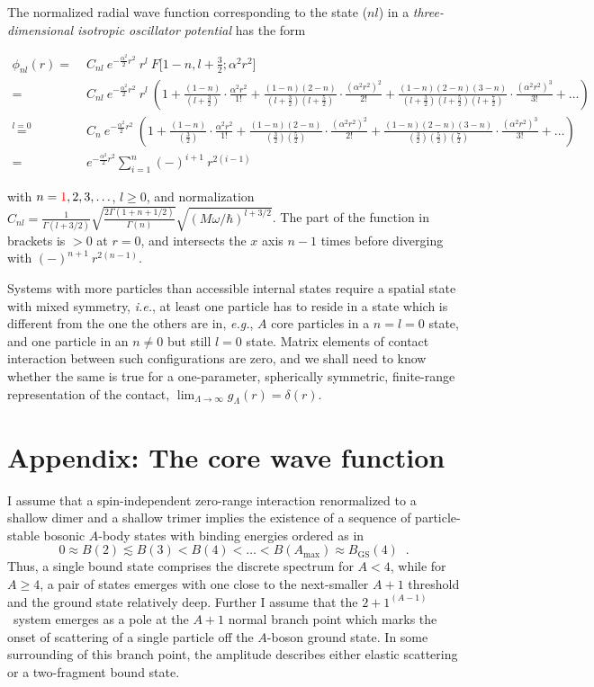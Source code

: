 \documentclass
[aps,nofootinbib,prl,showpacs,twocolumn,groupedaddress,superscriptaddress]
{revtex4}
\newcommand{\red}[1]{\textcolor{red}{#1}}
\newcommand{\la}{\label}
\newcommand{\be}{\begin{equation}}
\newcommand{\ee}{\end{equation}}
\newcommand{\eg}{\textit{e.g.}\;}
\newcommand{\ie}{\textit{i.e.}\;}
\newcommand{\abb}{\ensuremath{2\!+\!1^{(A-1)}}}
\begin{document}
The normalized radial wave function corresponding to the state ($nl$) in a 
{\it three-dimensional isotropic oscillator potential} has the form
\begin{widetext}
\begin{align*}
\phi_{nl}(r)=&\;C_{nl}~e^{-\frac{\alpha^2}{2}r^2}~r^l~F\big[1-n,l+\frac{3}{2};\alpha^2r^2\big]\\
=&\;C_{nl}~e^{-\frac{\alpha^2}{2}r^2}~r^l~
\left(1+\frac{(1-n)}{(l+\frac{3}{2})}\cdot\frac{\alpha^2r^2}{1!}
+\frac{(1-n)(2-n)}{(l+\frac{3}{2})(l+\frac{5}{2})}\cdot\frac{(\alpha^2r^2)^2}{2!}
+\frac{(1-n)(2-n)(3-n)}{(l+\frac{3}{2})(l+\frac{5}{2})(l+\frac{7}{2})}\cdot\frac{(\alpha^2r^2)^3}{3!}+\ldots\right)\\
\stackrel{l=0}{=}&\;C_{n}~e^{-\frac{\alpha^2}{2}r^2}~
\left(1+\frac{(1-n)}{(\frac{3}{2})}\cdot\frac{\alpha^2r^2}{1!}
+\frac{(1-n)(2-n)}{(\frac{3}{2})(\frac{5}{2})}\cdot\frac{(\alpha^2r^2)^2}{2!}
+\frac{(1-n)(2-n)(3-n)}{(\frac{3}{2})(\frac{5}{2})(\frac{7}{2})}\cdot\frac{(\alpha^2r^2)^3}{3!}+\ldots\right)\\
=&\;e^{-\frac{\alpha^2}{2}r^2}\sum_{i=1}^n(-)^{i+1}~r^{2(i-1)}
\end{align*}
\end{widetext}
with $n=\red{1},2,3,\ldots$, $l\geq 0$, and normalization $C_{nl}=\frac{1}{\Gamma(l+3/2)}\sqrt{\frac{2\Gamma(1+n+1/2)}{\Gamma(n)}}\sqrt{(M\omega/\hbar)^{l+3/2}}$. The part of the function in brackets
is $>0$ at $r=0$, and intersects the $x$ axis $n-1$ times before diverging with $(-)^{n+1}~r^{2(n-1)}$.

Systems with more particles than accessible internal states require a spatial state with mixed symmetry, \ie, at least one
particle has to reside in a state which is different from the one the others are in, \eg, $A$ core particles in a
$n=l=0$ state, and one particle in an $n\neq0$ but still $l=0$ state. Matrix elements of contact interaction between
such configurations are zero, and we shall need to know whether the same is true for a one-parameter, spherically symmetric,
finite-range representation of the contact, $\lim_{\Lambda\to\infty}g_\Lambda(r)=\delta(r)$. 



\section{Appendix: The core wave function}
I assume that a spin-independent zero-range interaction renormalized to a shallow dimer and a shallow trimer
implies the existence of a sequence of particle-stable bosonic $A$-body states with binding energies
ordered as in
\be\la{eq:be_ordering}
0\approx B(2)\lesssim B(3)<B(4)<\ldots<B(A_\text{max})\approx B_\text{GS}(4)\;\;.
\ee
Thus, a single bound state comprises the discrete spectrum for $A<4$, while for $A\geq 4$, a pair of states emerges
with one close to the next-smaller $A+1$ threshold and the ground state relatively deep.
Further I assume that the \abb~system emerges as a pole at the $A+1$ normal branch point which marks the onset of
scattering of a single particle off the $A$-boson ground state. In some surrounding of this branch point, the amplitude
describes either elastic scattering or a two-fragment bound state. 
\end{document}
